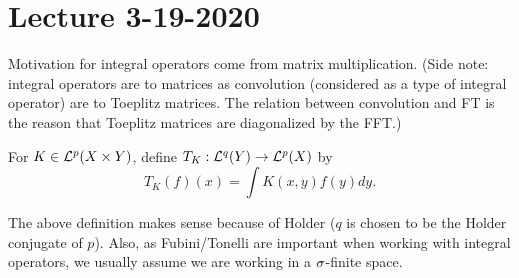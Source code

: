 \section{Lecture 3-19-2020}
Motivation for integral operators come from matrix multiplication. (Side note: integral operators are to matrices as convolution (considered as a type of integral operator) are to Toeplitz matrices. The relation between convolution and FT is the reason that Toeplitz matrices are diagonalized by the FFT.)
\begin{dfn}
    For $K \in {\mathcal L}^p(X\times Y)$, define $T_K: {\mathcal L}^q(Y) \rightarrow {\mathcal L}^p(X)$ by
    \[
        T_K(f)(x) = \int K(x,y)f(y)dy.
    \]
\end{dfn}
The above definition makes sense because of Holder ($q$ is chosen to be the Holder conjugate of $p$). Also, as Fubini/Tonelli are important when working with integral operators, we usually assume we are working in a $\sigma$-finite space.
